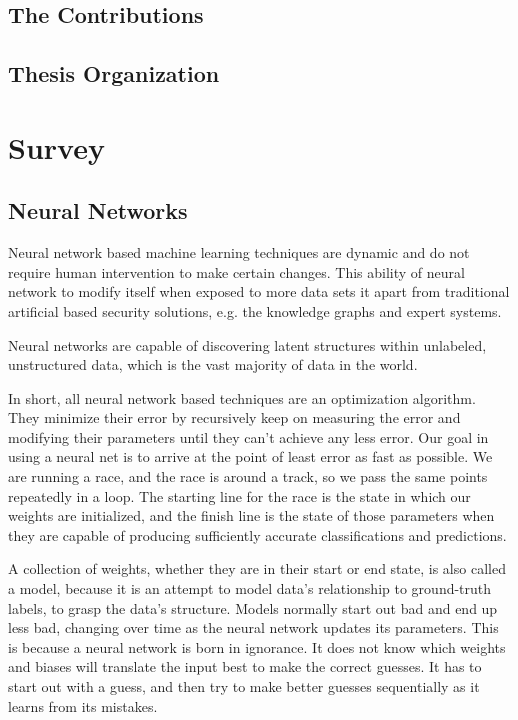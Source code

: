\documentclass[10pt]{llncs}
\begin{document}
\subsection{The Contributions}


%
\subsection{Thesis Organization}


%
\section{Survey}


%
\subsection{Neural Networks}
Neural network based machine learning techniques are dynamic and do not require human intervention to make certain changes. This ability of neural network to modify itself when exposed to more data sets it apart from traditional artificial based security solutions, e.g. the knowledge graphs and expert systems. 

Neural networks are capable of discovering latent structures within unlabeled, unstructured data, which is the vast majority of data in the world.

In short, all neural network based techniques are an optimization algorithm. They minimize their error by recursively keep on measuring the error and modifying their parameters until they can’t achieve any less error. Our goal in using a neural net is to arrive at the point of least error as fast as possible. We are running a race, and the race is around a track, so we pass the same points repeatedly in a loop. The starting line for the race is the state in which our weights are initialized, and the finish line is the state of those parameters when they are capable of producing sufficiently accurate classifications and predictions.

A collection of weights, whether they are in their start or end state, is also called a model, because it is an attempt to model data’s relationship to ground-truth labels, to grasp the data’s structure. Models normally start out bad and end up less bad, changing over time as the neural network updates its parameters. This is because a neural network is born in ignorance. It does not know which weights and biases will translate the input best to make the correct guesses. It has to start out with a guess, and then try to make better guesses sequentially as it learns from its mistakes.
\end{document}
